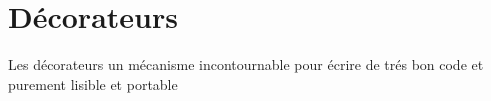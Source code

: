 \chapter{D\'ecorateurs}
Les d\'ecorateurs un m\'ecanisme incontournable pour \'ecrire de tr\'es bon code et purement 
lisible et portable
